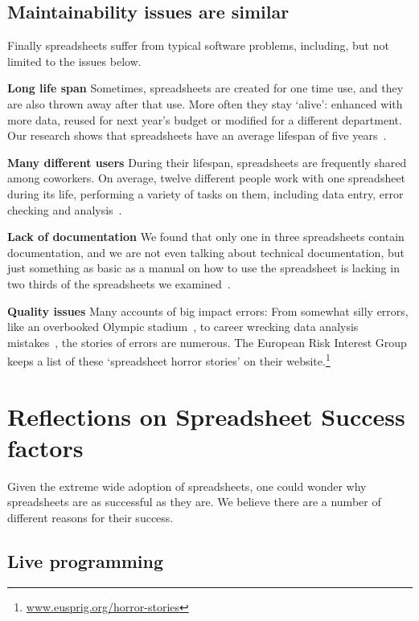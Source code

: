 \documentclass[conference]{IEEEtran}
\begin{document}
\subsection{Maintainability issues are similar}

Finally spreadsheets suffer from typical software problems, including, but not limited to the issues below.

\textbf{Long life span} Sometimes, spreadsheets are created for one time use, and they are also thrown away after that use. More often they stay ‘alive’: enhanced with more data, reused for next year's budget or modified for a different department. Our research shows that spreadsheets have an average lifespan of five years~\cite{hermans_supporting_2011}.

\textbf{Many different users} During their lifespan, spreadsheets are frequently shared among coworkers. On average, twelve different people work with one spreadsheet during its life, performing a variety of tasks on them, including data entry, error checking and analysis~\cite{hermans_supporting_2011}.

\textbf{Lack of documentation} We found that only one in three spreadsheets contain documentation, and we are not even talking about technical documentation, but just something as basic as a manual on how to use the spreadsheet is lacking in two thirds of the spreadsheets we examined~\cite{hermans_supporting_2011}.

\textbf{Quality issues} Many accounts of big impact errors: From somewhat silly errors, like an overbooked Olympic stadium~\cite{Kelso2012}, to career wrecking data analysis mistakes~\cite{Herndon2014}, the stories of errors are numerous. The European Risk Interest Group keeps a list of these ‘spreadsheet horror stories’ on their website.\footnote{\url{www.eusprig.org/horror-stories}}

\section{Reflections on Spreadsheet Success factors}
Given the extreme wide adoption of spreadsheets, one could wonder why spreadsheets are as successful as they are. We believe there are a number of different reasons for their success.

\subsection{Live programming}
\end{document}
